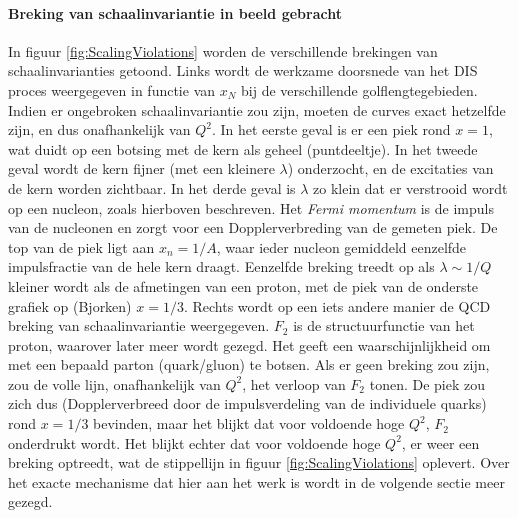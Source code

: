 \documentclass[a4paper,11pt]{article}
\numberwithin{equation}{section} %
\begin{document}
      \paragraph{Breking van schaalinvariantie in beeld gebracht}
In figuur \ref{fig:ScalingViolations} worden de verschillende brekingen van schaalinvarianties getoond.
Links wordt de werkzame doorsnede van het DIS proces weergegeven in functie van $x_N$ bij de verschillende golflengtegebieden.
Indien er ongebroken schaalinvariantie zou zijn, moeten de curves exact hetzelfde zijn, en dus onafhankelijk  van $Q^2$.
In het eerste geval is er een piek rond $x=1$, wat duidt op een botsing met de kern als geheel (puntdeeltje).
In het tweede geval wordt de kern fijner (met een kleinere $\lambda$) onderzocht, en de excitaties van de kern worden zichtbaar.
In het derde geval is $\lambda$ zo klein dat er verstrooid wordt op een nucleon, zoals hierboven beschreven.
Het \textit{Fermi momentum} is de impuls van de nucleonen en zorgt voor een Dopplerverbreding van de gemeten piek.
De top van de piek ligt aan $x_n=1/A$, waar ieder nucleon gemiddeld eenzelfde impulsfractie van de hele kern draagt.
Eenzelfde breking treedt op als $\lambda \sim 1/Q$ kleiner wordt als de afmetingen van een proton, met de piek van de onderste grafiek op (Bjorken) $x=1/3$.
Rechts wordt op een iets andere manier de QCD breking van schaalinvariantie weergegeven.
$F_2$ is de structuurfunctie van het proton, waarover later meer wordt gezegd.
Het geeft een waarschijnlijkheid om met een bepaald parton (quark/gluon) te botsen.
Als er geen breking zou zijn, zou de volle lijn, onafhankelijk van $Q^2$, het verloop van $F_2$ tonen.
De piek zou zich dus (Dopplerverbreed door de impulsverdeling van de individuele quarks) rond $x=1/3$ bevinden, maar het blijkt dat voor voldoende hoge $Q^2$, $F_2$ onderdrukt wordt.
Het blijkt echter dat voor voldoende hoge $Q^2$, er weer een breking optreedt, wat de stippellijn in figuur \ref{fig:ScalingViolations} oplevert.
Over het exacte mechanisme dat hier aan het werk is wordt in de volgende sectie meer gezegd.
\end{document}
